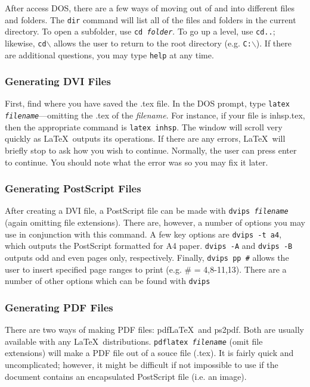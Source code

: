 \documentclass{article}
\begin{document}
After access DOS, there are a few ways of moving out of and into different files and folders. The \texttt{dir} command will list all of the files and folders in the current directory. To open a subfolder, use \texttt{cd \textit{folder}}. To go up a level, use \texttt{cd..}; likewise, \texttt{cd$\backslash$} allows the user to return to the root directory (e.g. \texttt{C:$\backslash$}). If there are additional questions, you may type \texttt{help} at any time.

\subsubsection{Generating DVI Files}

First, find where you have saved the .tex file. In the DOS prompt, type \texttt{latex \textit{filename}}---omitting the .tex of the \textit{filename}. For instance, if your file is inhsp.tex, then the appropriate command is \texttt{latex inhsp}. The window will scroll very quickly as \LaTeX\ outputs its operations. If there are any errors, \LaTeX\ will briefly stop to ask how you wish to continue. Normally, the user can press enter to continue. You should note what the error was so you may fix it later.

\subsubsection{Generating PostScript Files}

After creating a DVI file, a PostScript file can be made with \texttt{dvips \textit{filename}} (again omitting file extensions). There are, however, a number of options you may use in conjunction with this command. A few key options are \texttt{dvips -t a4}, which outputs the PostScript formatted for A4 paper. \texttt{dvips -A} and \texttt{dvips -B} outputs odd and even pages only, respectively.  Finally, \texttt{dvips pp \#} allows the user to insert specified page ranges to print (e.g. \# = 4,8-11,13). There are a number of other options which can be found with \texttt{dvips}

\subsubsection{Generating PDF Files}

There are two ways of making PDF files: pdf\LaTeX\ and ps2pdf. Both are usually available with any \LaTeX\ distributions. \texttt{pdflatex \textit{filename}} (omit file extensions) will make a PDF file out of a souce file (.tex). It is fairly quick and uncomplicated; however, it might be difficult if not impossible to use if the document contains an encapsulated PostScript file (i.e. an image).
\end{document}
